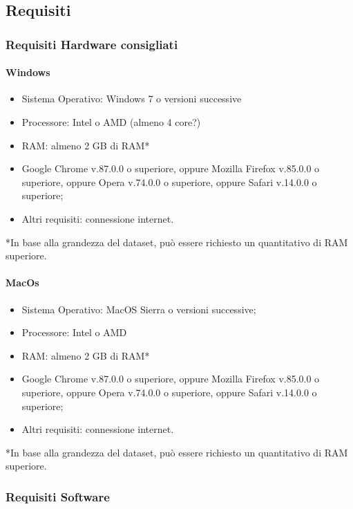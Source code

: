 \documentclass[../manuale_utente.tex]{subfiles}
\begin{document}
\subsection{Requisiti}
    \label{sec:requisiti}
\subsubsection{Requisiti Hardware consigliati}
    \label{subsub:req_h}

\paragraph{Windows}
    \label{par:Windows_req}

\begin{itemize}
    \item Sistema Operativo: Windows 7 o versioni successive
    \item Processore: Intel o AMD (almeno 4 core?)
    \item RAM: almeno 2 GB di RAM*
    \item Google Chrome v.87.0.0 o superiore, oppure Mozilla Firefox v.85.0.0 o superiore, oppure Opera v.74.0.0 o superiore, oppure Safari v.14.0.0 o superiore;
    \item Altri requisiti: connessione internet.
\end{itemize}
*In base alla grandezza del dataset, può essere richiesto un quantitativo di RAM superiore.

\paragraph{MacOs}
    \label{par:mac_req}

\begin{itemize}
    \item Sistema Operativo: MacOS Sierra o versioni successive;
    \item Processore: Intel o AMD
    \item RAM: almeno 2 GB di RAM*
    \item Google Chrome v.87.0.0 o superiore, oppure Mozilla Firefox v.85.0.0 o superiore, oppure Opera v.74.0.0 o superiore, oppure Safari v.14.0.0 o superiore;
    \item Altri requisiti: connessione internet.
\end{itemize}
*In base alla grandezza del dataset, può essere richiesto un quantitativo di RAM superiore.

\subsubsection{Requisiti Software}
    \label{subsub:req_s}
\end{document}
